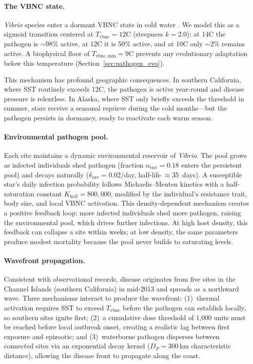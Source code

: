 \paragraph{The VBNC state.}
\textit{Vibrio} species enter a dormant VBNC state in cold water
\citep{liu2019}.  We model this as a sigmoid transition centered at
$T_\mathrm{vbnc} = 12$\textdegree C (steepness $k = 2.0$): at
14\textdegree C the pathogen is ${\sim}$98\% active, at 12\textdegree C
it is 50\% active, and at 10\textdegree C only ${\sim}$2\% remains active.
A biophysical floor of $T_\mathrm{vbnc,min} = 9$\textdegree C prevents any
evolutionary adaptation below this temperature (Section~\ref{sec:pathogen_evo}).

This mechanism has profound geographic consequences.  In southern California,
where SST routinely exceeds 12\textdegree C, the pathogen is active
year-round and disease pressure is relentless.  In Alaska, where SST only
briefly exceeds the threshold in summer, stars receive a seasonal reprieve
during the cold months---but the pathogen persists in dormancy, ready to
reactivate each warm season.

\paragraph{Environmental pathogen pool.}
Each site maintains a dynamic environmental reservoir of \textit{Vibrio}.
The pool grows as infected individuals shed pathogen (fraction
$\alpha_\mathrm{env} = 0.18$ enters the persistent pool) and decays
naturally ($\delta_\mathrm{env} = 0.02$/day, half-life $\approx$35~days).
A susceptible star's daily infection probability follows Michaelis--Menten
kinetics with a half-saturation constant $K_\mathrm{half} = 800{,}000$,
modified by the individual's resistance trait, body size, and local VBNC
activation.  This density-dependent mechanism creates a positive feedback
loop: more infected individuals shed more pathogen, raising the
environmental pool, which drives further infections.  At high host density,
this feedback can collapse a site within weeks; at low density, the same
parameters produce modest mortality because the pool never builds to
saturating levels.

\paragraph{Wavefront propagation.}
Consistent with observational records, disease originates from five sites
in the Channel Islands (southern California) in mid-2013 and spreads as a
northward wave.  Three mechanisms interact to produce the wavefront:
(1)~thermal activation requires SST to exceed $T_\mathrm{vbnc}$ before the
pathogen can establish locally, so southern sites ignite first;
(2)~a cumulative dose threshold of 1{,}000 units must be reached before
local outbreak onset, creating a realistic lag between first exposure and
epizootic; and (3)~waterborne pathogen disperses between connected sites
via an exponential decay kernel ($D_P = 300$\,km characteristic distance),
allowing the disease front to propagate along the coast.

